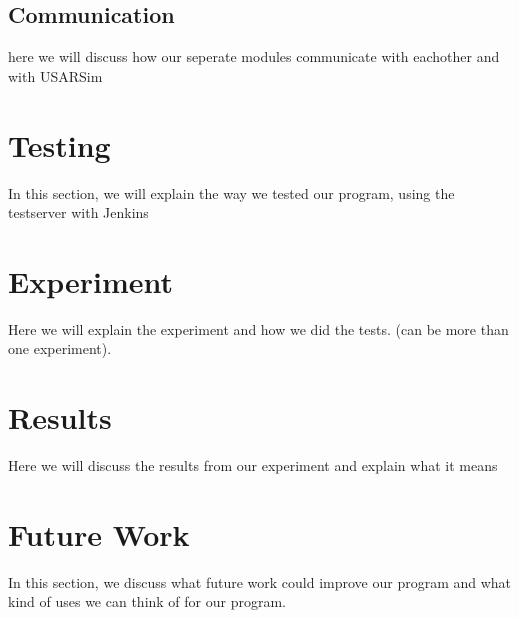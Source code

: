 \documentclass[a4paper,10pt]{article}
\begin{document}
\subsection{Communication}
here we will discuss how our seperate modules communicate with eachother and with USARSim

\section{Testing}
In this section, we will explain the way we tested our program, using the testserver with Jenkins

\section{Experiment}
Here we will explain the experiment and how we did the tests. (can be more than one experiment).

\section{Results}
Here we will discuss the results from our experiment and explain what it means

\section{Future Work}
In this section, we discuss what future work could improve our program and what kind of uses we can think of for our program.
\end{document}
